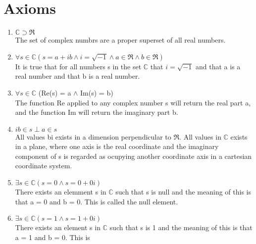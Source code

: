 \documentclass[10pt,a4paper]{book}
\begin{document}
	\chapter{Axioms}
	\begin{enumerate}
		\item $\mathbb{C} \supset \Re$ \\ The set of complex numbrs are a proper superset of all real numbers.
		\item $\forall s \in \mathbb{C} ( s = a + ib \wedge i = \sqrt{-1} \wedge a \in \Re \wedge b \in \Re)$ \\ It is true that for all numbers s in the set $\mathbb{C}$ that $ i = \sqrt{-1}$ and that a is a real number and that b is a real number.
		\item $\forall s \in \mathbb{C}$ (Re(s) = a $\wedge$ Im(s) = b) \\ The function Re applied to any complex number s will return the real part a, and the function Im will return the imaginary part b.
		\item $ ib \in s \perp a \in s $ \\ All values bi exists in a dimension perpendicular to $\Re$. All values in $\mathbb{C}$ exists in a plane, where one axis is the real coordinate and the imaginary component of s is regarded as ocupying another coordinate axis in a cartesian coordinate system.
		\item $\exists s \in \mathbb{C} (s = 0 \wedge s = 0 + 0i) $ \\ There exists an elemment s in $\mathbb{C}$ such that s is null and the meaning of this is that a = 0 and b = 0. This is called the null element.
		\item $\exists s \in \mathbb{C} (s = 1 \wedge s = 1+0i) $ \\ There exists an element s in $\mathbb{C}$ such that s is 1 and the meaning of this is that a = 1 and b = 0. This is 
	\end{enumerate}
\end{document}
